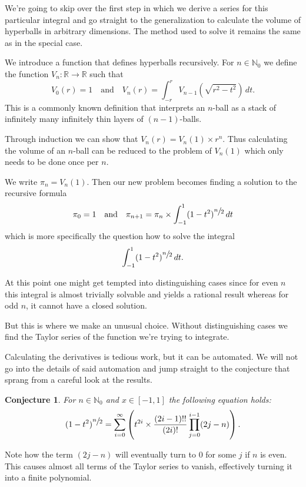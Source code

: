 \documentclass[a4paper,11pt]{scrartcl}
\newcounter{theoremcounter}
\theoremstyle{definition}
\theoremstyle{plain}
\newtheorem{myconjecture}[theoremcounter]{Conjecture}
\theoremstyle{remark}
\newcommand{\truesfrac}[2]{{\displaystyle \sfrac{#1}{#2}}}
\begin{document}
We're going to skip over the first step in which we derive a series for this particular integral and go straight to the generalization to calculate the volume of hyperballs in arbitrary dimensions.
The method used to solve it remains the same as in the special case.

We introduce a function that defines hyperballs recursively.
For $n \in \mathbb{N}_0$ we define the function $V_n : \mathbb{R} \rightarrow \mathbb{R}$ such that
\[
V_0(r) = 1
\quad \text{and} \quad
V_n(r) = \int_{-r}^r V_{n-1} \left(\sqrt{r^2 - t^2}\right) \, dt.
\]
This is a commonly known definition that interprets an $n$-ball as a stack of infinitely many infinitely thin layers of $(n-1)$-balls.

Through induction we can show that $V_n(r) = V_n(1) \times r^n$.
Thus calculating the volume of an $n$-ball can be reduced to the problem of $V_n(1)$ which only needs to be done once per $n$.

We write $\pi_n = V_n(1)$.
Then our new problem becomes finding a solution to the recursive formula
\[
\pi_0 = 1
\quad \text{and} \quad
\pi_{n+1} = \pi_n \times \int_{-1}^1 (1 - t^2)^{\truesfrac{n}{2}} \, dt
\]
which is more specifically the question how to solve the integral
\[
\int_{-1}^1 (1 - t^2)^{\truesfrac{n}{2}} \, dt.
\]

At this point one might get tempted into distinguishing cases since for even $n$ this integral is almost trivially solvable and yields a rational result whereas for odd $n$, it cannot have a closed solution.

But this is where we make an unusual choice.
Without distinguishing cases we find the Taylor series of the function we're trying to integrate.

Calculating the derivatives is tedious work, but it can be automated.
We will not go into the details of said automation and jump straight to the conjecture that sprang from a careful look at the results.

\begin{myconjecture}
\label{ConjectureHyperball}
For $n \in \mathbb{N}_0$ and $x \in [-1, 1]$ the following equation holds:
\[
(1 - t^2)^{\truesfrac{n}{2}}
= \sum_{i=0}^{\infty} \left( t^{2i} \times \frac{(2i-1)!!}{(2i)!} \prod_{j=0}^{i-1}(2j-n) \right).
\]
\end{myconjecture}

Note how the term $(2j - n)$ will eventually turn to $0$ for some $j$ if $n$ is even.
This causes almost all terms of the Taylor series to vanish, effectively turning it into a finite polynomial.
\end{document}
